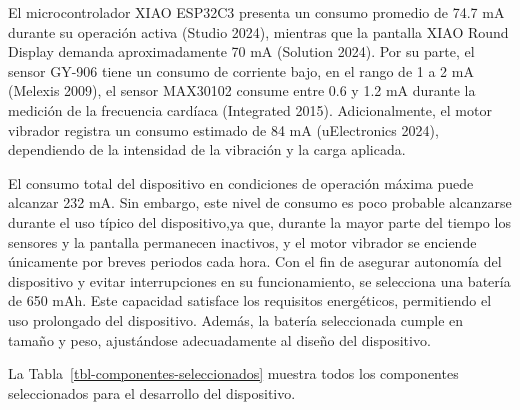 \documentclass[
  letterpaper,
  DIV=11,
  numbers=noendperiod]{scrreport}
\begin{document}
El microcontrolador XIAO ESP32C3 presenta un consumo promedio de 74.7 mA
durante su operación activa (Studio 2024), mientras que la pantalla XIAO
Round Display demanda aproximadamente 70 mA (Solution 2024). Por su
parte, el sensor GY-906 tiene un consumo de corriente bajo, en el rango
de 1 a 2 mA (Melexis 2009), el sensor MAX30102 consume entre 0.6 y 1.2
mA durante la medición de la frecuencia cardíaca (Integrated 2015).
Adicionalmente, el motor vibrador registra un consumo estimado de 84 mA
(uElectronics 2024), dependiendo de la intensidad de la vibración y la
carga aplicada.

El consumo total del dispositivo en condiciones de operación máxima
puede alcanzar 232 mA. Sin embargo, este nivel de consumo es poco
probable alcanzarse durante el uso típico del dispositivo,ya que,
durante la mayor parte del tiempo los sensores y la pantalla permanecen
inactivos, y el motor vibrador se enciende únicamente por breves
periodos cada hora. Con el fin de asegurar autonomía del dispositivo y
evitar interrupciones en su funcionamiento, se selecciona una batería de
650 mAh. Este capacidad satisface los requisitos energéticos,
permitiendo el uso prolongado del dispositivo. Además, la batería
seleccionada cumple en tamaño y peso, ajustándose adecuadamente al
diseño del dispositivo.

La Tabla~\ref{tbl-componentes-seleccionados} muestra todos los
componentes seleccionados para el desarrollo del dispositivo.
\end{document}
